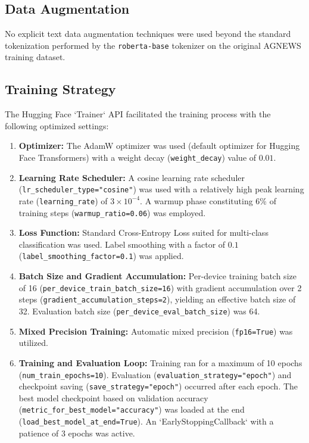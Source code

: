 \documentclass[twoside, 11pt]{article}
\begin{document}
\subsection{Data Augmentation}
No explicit text data augmentation techniques were used beyond the standard tokenization performed by the \texttt{roberta-base} tokenizer on the original AGNEWS training dataset.

\subsection{Training Strategy}
The Hugging Face `Trainer` API facilitated the training process with the following optimized settings:
\begin{enumerate}
    \item \textbf{Optimizer:} The AdamW optimizer \cite{loshchilov2017decoupled} was used (default optimizer for Hugging Face Transformers) with a weight decay (\texttt{weight\_decay}) value of $0.01$.
    \item \textbf{Learning Rate Scheduler:} A cosine learning rate scheduler (\texttt{lr\_scheduler\_type="cosine"}) was used with a relatively high peak learning rate (\texttt{learning\_rate}) of $3 \times 10^{-4}$. A warmup phase constituting 6\% of training steps (\texttt{warmup\_ratio=0.06}) was employed.
    \item \textbf{Loss Function:} Standard Cross-Entropy Loss suited for multi-class classification was used. Label smoothing with a factor of $0.1$ (\texttt{label\_smoothing\_factor=0.1}) was applied.
    \item \textbf{Batch Size and Gradient Accumulation:} Per-device training batch size of 16 (\texttt{per\_device\_train\_batch\_size=16}) with gradient accumulation over 2 steps (\texttt{gradient\_accumulation\_steps=2}), yielding an effective batch size of 32. Evaluation batch size (\texttt{per\_device\_eval\_batch\_size}) was 64.
    \item \textbf{Mixed Precision Training:} Automatic mixed precision (\texttt{fp16=True}) was utilized.
    \item \textbf{Training and Evaluation Loop:} Training ran for a maximum of 10 epochs (\texttt{num\_train\_epochs=10}). Evaluation (\texttt{evaluation\_strategy="epoch"}) and checkpoint saving (\texttt{save\_strategy="epoch"}) occurred after each epoch. The best model checkpoint based on validation accuracy (\texttt{metric\_for\_best\_model="accuracy"}) was loaded at the end (\texttt{load\_best\_model\_at\_end=True}). An `EarlyStoppingCallback` with a patience of 3 epochs was active.
\end{enumerate}
\end{document}
